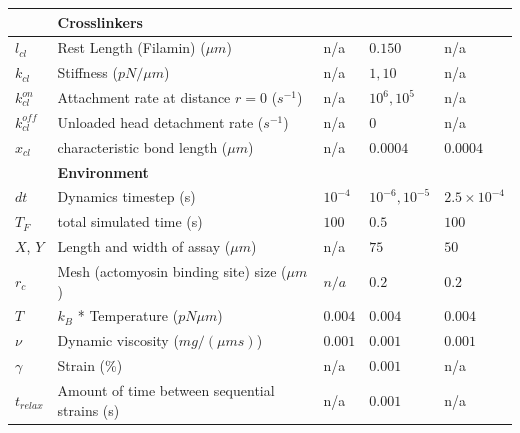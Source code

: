 \documentclass[12pt]{article}
\begin{document}
\begin{table}
\begin{tabular}{|C{2cm}|L{7cm}|C{2cm}|C{2cm}|C{2cm}|}
    \hline
    &\bf{Crosslinkers} & & & \\
    \hline
    $l_{cl}$& Rest Length (Filamin) ($\mu m$)\cite{ferrer2008} & n/a &$0.150$ &n/a\\
    $k_{cl}$ & Stiffness ($pN/\mu m$)& n/a & $1,10$ & n/a\\
    $k^{on}_{cl}$ & Attachment rate at distance $r=0$ ($s^{-1}$)& n/a & $10^6,10^5$ &n/a \\
    $k^{off}_{cl}$ & Unloaded head detachment rate ($s^{-1}$)& n/a & 0 & n/a\\
    $x_{cl}$& characteristic bond length ($\mu m$) & n/a & $0.0004$ & $0.0004$ \\
    \hline
    &\bf{Environment} & & & \\
    \hline
    $dt$ & Dynamics timestep (s) & $10^{-4}$ & $10^{-6},10^{-5}$ &$2.5\times10^{-4}$ \\
    $T_F$& total simulated time (s) & $100$ & $0.5$ & $100$ \\
    $X$, $Y$ & Length and width of assay ($\mu m$)& n/a & $75$ & $50$ \\
    $r_c$ & Mesh (actomyosin binding site) size ($\mu m$) & $n/a$ & $0.2 $ & $0.2 $\\
    $T$ & $k_B$ * Temperature ($pN\mu m$)& $0.004$ & $0.004$& $0.004$\\
    $\nu$ & Dynamic viscosity ($mg/(\mu m s)$) & $0.001$& $0.001$& $0.001$\\
    $\gamma$ & Strain (\%) \cite{stricker2010}& n/a& $0.001$&n/a\\
    $t_{relax}$ & Amount of time between sequential strains (s)& n/a& $0.001$ &n/a\\
    \hline
  \end{tabular}
  \label{tab:params}
\end{table}
\end{document}
